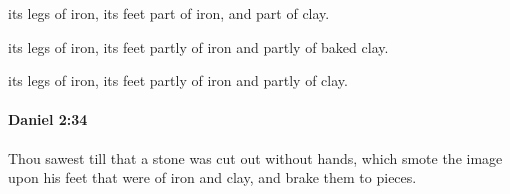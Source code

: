 			\begin{versebox}
					\item[BHS] 
					\item[LXX] 
					\item[ASV] its legs of iron, its feet part of iron, and part of clay.
					\item[NIV] its legs of iron, its feet partly of iron and partly of baked clay.
					\item[NRSV] its legs of iron, its feet partly of iron and partly of clay.
			\end{versebox}

		\paragraph{Daniel 2:34} %
			\label{DANIEL-2-34}

			Thou sawest till that a stone was cut out without hands, which smote the image upon his feet that were of iron and clay, and brake them to pieces.

